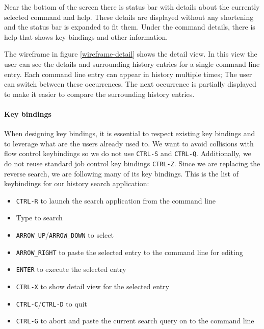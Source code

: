 Near the bottom of the screen there is status bar with details about the currently selected command and help. These details are displayed without any shortening and the status bar is expanded to fit them. Under the command details, there is help that shows key bindings and other information.


The wireframe in figure \ref{wireframe-detail} shows the detail view. In this view the user can see the details and surrounding history entries for a single command line entry. Each command line entry can appear in history multiple times; The user can switch between these occurrences. The next occurrence is partially displayed to make it easier to compare the surrounding history entries.



\paragraph{Key bindings}
When designing key bindings, it is essential to respect existing key bindings and to leverage what are the users already used to.
We want to avoid collisions with flow control keybindings so we do not use \verb|CTRL-S| and \verb|CTRL-Q|. Additionally, we do not reuse standard job control key bindings \verb|CTRL-Z|. 
Since we are replacing the reverse search, we are following many of its key bindings. This is the list of keybindings for our history search application:

\begin{itemize}
    \item \verb|CTRL-R| to launch the search application from the command line
    \item Type to search
    \item \verb|ARROW_UP|/\verb|ARROW_DOWN| to select 
    \item \verb|ARROW_RIGHT| to paste the selected entry to the command line for editing
    \item \verb|ENTER| to execute the selected entry
    \item \verb|CTRL-X| to show detail view for the selected entry
    \item \verb|CTRL-C|/\verb|CTRL-D| to quit
    \item \verb|CTRL-G| to abort and paste the current search query on to the command line
\end{itemize}


